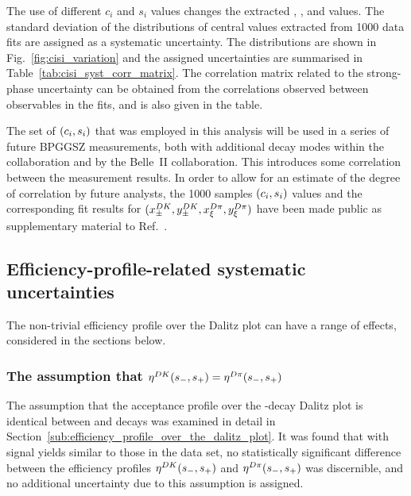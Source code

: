The use of different $c_i$ and $s_i$ values changes the extracted \xpmdk, \ypmdk, \xxidpi and \yxidpi values. The standard deviation of the distributions of central values extracted from 1000 data fits are assigned as a systematic uncertainty. The distributions are shown in Fig.~\ref{fig:cisi_variation} and the assigned uncertainties are summarised in Table~\ref{tab:cisi_syst_corr_matrix}. The correlation matrix related to the strong-phase uncertainty can be obtained from the correlations observed between observables in the fits, and is also given in the table. 

The set of $(c_i, s_i)$ that was employed in this analysis will be used in a series of future BPGGSZ measurements, both with additional \B decay modes within the \lhcb collaboration and by the Belle~II collaboration. This introduces some correlation between the measurement results. In order to allow for an estimate of the degree of correlation by future analysts, the 1000 samples $(c_i,s_i)$ values and the corresponding fit results for $(x_\pm^{{D}{K}}, y_\pm^{{D}{K}}, x_\xi^{{D}\pi}, y_\xi^{{D}\pi})$ have been made public as supplementary material to Ref.~\cite{GGSZ-B2Dh}.






\subsection{Efficiency-profile-related systematic uncertainties} %
\label{sub:efficiency_profile_related_systematic_uncertainties}

The non-trivial efficiency profile over the Dalitz plot can have a range of effects, considered in the sections below.


\subsubsection{The assumption that \texorpdfstring{$\eta^{{D}{K}}(s_-, s_+) = \eta^{{D}\pi}(s_-, s_+)$}{etaDK = etaDpi}}

The assumption that the acceptance profile  over the \D-decay Dalitz plot is identical between \BtoDK and \BtoDpi decays was examined in detail in Section~\ref{sub:efficiency_profile_over_the_dalitz_plot}. It was found that with signal yields similar to those in the data set, no statistically significant difference between the efficiency profiles $\eta^{{D}{K}}(s_-, s_+)$  and $\eta^{{D}\pi}(s_-, s_+)$ was discernible, and no additional uncertainty due to this assumption is assigned.

